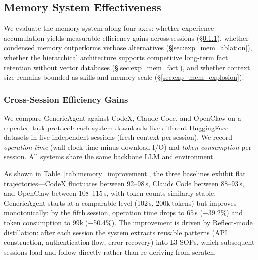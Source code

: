 \subsection{Memory System Effectiveness}
\label{sec:exp_memory}

We evaluate the memory system along four axes: whether experience accumulation yields measurable efficiency gains across sessions (\S\ref{sec:exp_mem_eff}), whether condensed memory outperforms verbose alternatives (\S\ref{sec:exp_mem_ablation}), whether the hierarchical architecture supports competitive long-term fact retention without vector databases (\S\ref{sec:exp_mem_fact}), and whether context size remains bounded as skills and memory scale (\S\ref{sec:exp_mem_explosion}).


\subsubsection{Cross-Session Efficiency Gains}
\label{sec:exp_mem_eff}

We compare GenericAgent against CodeX, Claude Code, and OpenClaw on a repeated-task protocol: each system downloads five different HuggingFace datasets in five independent sessions (fresh context per session).
We record \emph{operation time} (wall-clock time minus download I/O) and \emph{token consumption} per session.
All systems share the same backbone LLM and environment.

As shown in Table~\ref{tab:memory_improvement}, the three baselines exhibit flat trajectories---CodeX fluctuates between 92--98\,s, Claude Code between 88--93\,s, and OpenClaw between 108--115\,s, with token counts similarly stable.
GenericAgent starts at a comparable level (102\,s, 200k tokens) but improves monotonically: by the fifth session, operation time drops to 65\,s ($-$39.2\%) and token consumption to 99k ($-$50.4\%).
The improvement is driven by Reflect-mode distillation: after each session the system extracts reusable patterns (API construction, authentication flow, error recovery) into L3 SOPs, which subsequent sessions load and follow directly rather than re-deriving from scratch.

